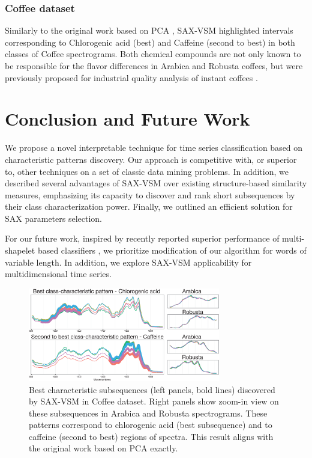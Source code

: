 \documentclass[conference]{IEEEtran}
\begin{document}
\subsubsection{Coffee dataset}
Similarly to the original work based on PCA \cite{coffee}, SAX-VSM highlighted intervals 
corresponding to Chlorogenic acid (best) and Caffeine (second to best) 
in both classes of Coffee spectrograms. Both chemical compounds are 
not only known to be responsible for the flavor differences in 
Arabica and Robusta coffees, but were previously proposed for industrial 
quality analysis of instant coffees \cite{coffee}.

\section{Conclusion and Future Work} \label{conclusion}
We propose a novel interpretable technique for time series classification
based on characteristic patterns discovery. Our approach is competitive with, 
or superior to, other techniques on a set of classic data mining problems. In addition, 
we described several advantages of SAX-VSM over existing structure-based similarity measures,
emphasizing its capacity to discover and rank short subsequences by their class characterization
power. Finally, we outlined an efficient solution for SAX parameters selection.

For our future work, inspired by recently reported superior performance of multi-shapelet based 
classifiers \cite{bagnal}, we prioritize modification of our algorithm for words of variable length.
In addition, we explore SAX-VSM applicability for multidimensional time series. 


\begin{figure}[t]
   \centering
   \vspace{-0.2cm}
   \includegraphics[width=84mm]{figures/coffee_patterns.eps}
   \caption{
   Best characteristic subsequences (left panels, bold lines) discovered by SAX-VSM in
   {Coffee dataset}. Right panels show zoom-in view on these subsequences in Arabica
   and Robusta spectrograms.
   These patterns correspond to chlorogenic acid (best subsequence) 
   and to caffeine (second to best) regions of spectra. This result aligns with
   the original work based on PCA \cite{coffee} exactly.
   }
   \label{fig:coffee}
   \vspace{-0.2cm}
\end{figure}
\end{document}
